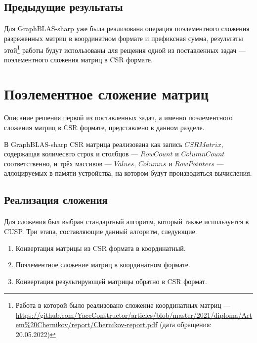 \documentclass[14pt]{matmex-diploma-custom}
\begin{document}
\subsection{Предыдущие результаты}
\paragraph{} Для GraphBLAS-sharp уже была реализована операция поэлементного сложения разреженных матриц в координатном формате и префиксная сумма, результаты этой\footnote{Работа в которой было реализовано сложение координатных матриц --- \url{https://github.com/YaccConstructor/articles/blob/master/2021/diploma/Artem\%20Chernikov/report/Chernikov-report.pdf} (дата обращения: 20.05.2022)} работы будут использованы для рещения одной из поставленных задач --- поэлементного сложения матриц в CSR формате.

\section{Поэлементное сложение матриц}
\paragraph{} Описание решения первой из поставленных задач, а именно поэлементного сложения матриц в CSR формате, представлено в данном разделе.

В GraphBLAS-sharp CSR матрица реализована как запись $CSRMatrix$, содержащая количесвто строк и столбцов --- $RowCount$ и $ColumnCount$ соответственно, и трёх массивов --- $Values$, $Columns$ и $RowPointers$ --- аллоцируемых в памяти устройства, на котором будут производиться вычисления. 

\subsection{Реализация сложения}
\paragraph{} Для сложения был выбран стандартный алгоритм, который также используется в CUSP. Три этапа, составляющие данный алгоритм, следующие.
\begin{enumerate}
    \item Конвертация матрицы из CSR формата в координатный.
    \item Поэлементное сложение матриц в координатном формате.
    \item Конвертация результирующей матрицы обратно в CSR формат.
\end{enumerate}
\end{document}
